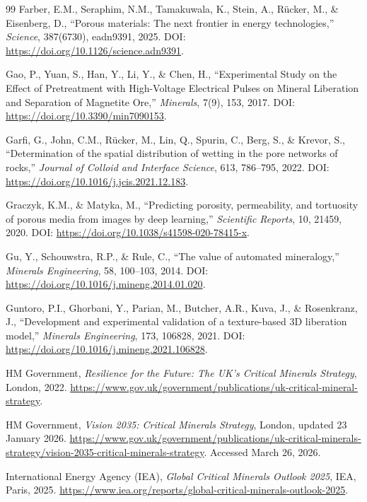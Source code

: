 \documentclass[12pt,a4paper]{article}
\begin{document}
\begin{thebibliography}{99}
Farber, E.M., Seraphim, N.M., Tamakuwala, K., Stein, A., Rücker, M., \& Eisenberg, D., ``Porous materials: The next frontier in energy technologies,'' \textit{Science}, 387(6730), eadn9391, 2025. DOI: \url{https://doi.org/10.1126/science.adn9391}.

Gao, P., Yuan, S., Han, Y., Li, Y., \& Chen, H., ``Experimental Study on the Effect of Pretreatment with High-Voltage Electrical Pulses on Mineral Liberation and Separation of Magnetite Ore,'' \textit{Minerals}, 7(9), 153, 2017. DOI: \url{https://doi.org/10.3390/min7090153}.

Garfi, G., John, C.M., Rücker, M., Lin, Q., Spurin, C., Berg, S., \& Krevor, S., ``Determination of the spatial distribution of wetting in the pore networks of rocks,'' \textit{Journal of Colloid and Interface Science}, 613, 786--795, 2022. DOI: \url{https://doi.org/10.1016/j.jcis.2021.12.183}.

Graczyk, K.M., \& Matyka, M., ``Predicting porosity, permeability, and tortuosity of porous media from images by deep learning,'' \textit{Scientific Reports}, 10, 21459, 2020. DOI: \url{https://doi.org/10.1038/s41598-020-78415-x}.

Gu, Y., Schouwstra, R.P., \& Rule, C., ``The value of automated mineralogy,'' \textit{Minerals Engineering}, 58, 100--103, 2014. DOI: \url{https://doi.org/10.1016/j.mineng.2014.01.020}.

Guntoro, P.I., Ghorbani, Y., Parian, M., Butcher, A.R., Kuva, J., \& Rosenkranz, J., ``Development and experimental validation of a texture-based 3D liberation model,'' \textit{Minerals Engineering}, 173, 106828, 2021. DOI: \url{https://doi.org/10.1016/j.mineng.2021.106828}.

HM Government, \textit{Resilience for the Future: The UK's Critical Minerals Strategy}, London, 2022. \url{https://www.gov.uk/government/publications/uk-critical-mineral-strategy}.

HM Government, \textit{Vision 2035: Critical Minerals Strategy}, London, updated 23 January 2026. \url{https://www.gov.uk/government/publications/uk-critical-minerals-strategy/vision-2035-critical-minerals-strategy}. Accessed March 26, 2026.

International Energy Agency (IEA), \textit{Global Critical Minerals Outlook 2025}, IEA, Paris, 2025. \url{https://www.iea.org/reports/global-critical-minerals-outlook-2025}.


\end{thebibliography}
\end{document}
